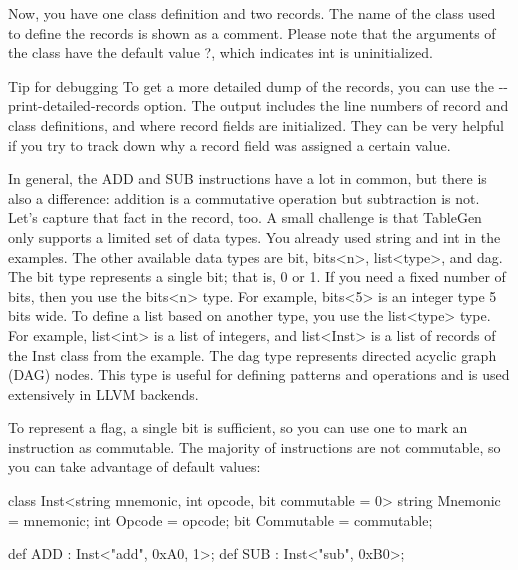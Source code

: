 
Now, you have one class definition and two records. The name of the class used to define the records is shown as a comment. Please note that the arguments of the class have the default value ?, which indicates int is uninitialized.

\begin{myTip}{Tip for debugging}
To get a more detailed dump of the records, you can use the -{}-print-detailed-records option. The output includes the line numbers of record and class definitions, and where record fields are initialized. They can be very helpful if you try to track down why a record field was assigned a certain value.
\end{myTip}

In general, the ADD and SUB instructions have a lot in common, but there is also a difference: addition is a commutative operation but subtraction is not. Let’s capture that fact in the record, too. A small challenge is that TableGen only supports a limited set of data types. You already used string and int in the examples. The other available data types are bit, bits<n>, list<type>, and dag.
The bit type represents a single bit; that is, 0 or 1. If you need a fixed number of bits, then you use the bits<n> type. For example, bits<5> is an integer type 5 bits wide. To define a list based on another type, you use the list<type> type. For example, list<int> is a list of integers, and list<Inst> is a list of records of the Inst class from the example. The dag type represents directed acyclic graph (DAG) nodes. This type is useful for defining patterns and operations and is used extensively in LLVM backends.

To represent a flag, a single bit is sufficient, so you can use one to mark an instruction as commutable. The majority of instructions are not commutable, so you can take advantage of default values:

\begin{shell}
class Inst<string mnemonic, int opcode, bit commutable = 0> {
    string Mnemonic = mnemonic;
    int Opcode = opcode;
    bit Commutable = commutable;
}

def ADD : Inst<"add", 0xA0, 1>;
def SUB : Inst<"sub", 0xB0>;
\end{shell}

